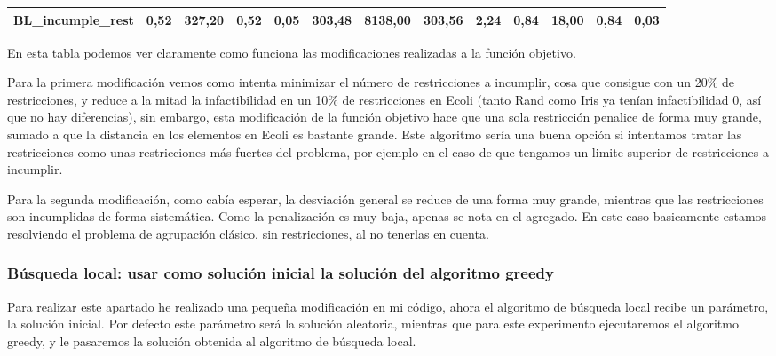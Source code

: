 \documentclass[12pt, spanish]{article}
\begin{document}
\begin{table}[H]
\begin{adjustwidth}{-1.9cm}{-1.9cm}
\begin{tabular}{|l|c|c|c|c|c|c|c|c|c|c|c|c|}
BL\_incumple\_rest                                      & 0,52                         & 327,20                         & 0,52                      & 0,05                   & 303,48                       & 8138,00                        & 303,56                    & 2,24                   & 0,84                         & 18,00                          & 0,84                      & 0,03               \\ \hline   
\end{tabular}

\end{adjustwidth}
\end{table}

En esta tabla podemos ver claramente como funciona las modificaciones realizadas a la función objetivo.

Para la primera modificación vemos como intenta minimizar el número de restricciones a incumplir, cosa que consigue con un 20\% de restricciones, y reduce a la mitad la infactibilidad en un 10\% de restricciones en Ecoli (tanto Rand como Iris ya tenían infactibilidad 0, así que no hay diferencias), sin embargo, esta modificación de la función objetivo hace que una sola restricción penalice de forma muy grande, sumado a que la distancia en los elementos en Ecoli es bastante grande. Este algoritmo sería una buena opción si intentamos tratar las restricciones como unas restricciones más fuertes del problema, por ejemplo en el caso de que tengamos un limite superior de restricciones a incumplir. 


Para la segunda modificación, como cabía esperar, la desviación general se reduce de una forma muy grande, mientras que las restricciones son incumplidas de forma sistemática. Como la penalización es muy baja, apenas se nota en el agregado. En este caso basicamente estamos resolviendo el problema de agrupación clásico, sin restricciones, al no tenerlas en cuenta.

\newpage

\subsubsection{Búsqueda local: usar como solución inicial la solución del algoritmo greedy}

Para realizar este apartado he realizado una pequeña modificación en mi código, ahora el algoritmo de búsqueda local recibe un parámetro, la solución inicial. Por defecto este parámetro será la solución aleatoria, mientras que para este experimento ejecutaremos el algoritmo greedy, y le pasaremos la solución obtenida al algoritmo de búsqueda local.
\end{document}

